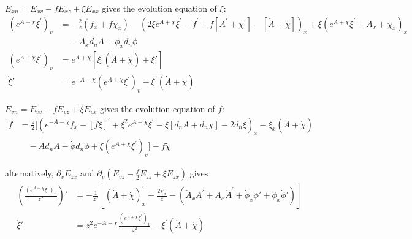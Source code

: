 \documentclass[12pt,a4paper]{ctexart}
\numberwithin{equation}{section}
\begin{document}
$E_{xn}=E_{xv}-fE_{xz}+\xi E_{xx}$ gives the evolution equation of $\xi$:
\begin{equation}
    \begin{aligned} 
        (e^{A+\chi}\xi^{\prime})_{v}&=-\frac{2}{z}(f_{x}+f\chi_{x})-(2\xi e^{A+\chi}\xi^{\prime}-f^{\prime}+f[A^{\prime}+\chi^{\prime}]-[\dot{A}+\dot{\chi}])_{x}+\xi(e^{A+\chi}\xi^{\prime}+A_{x}+\chi_{x})_{x}\\
        &\quad-A_{x}d_{n}A-\phi_{x}d_n\phi\\
        (e^{A+\chi}\xi^{\prime})_{v}&=e^{A+\chi}[\xi^{\prime}(\dot{A}+\dot{\chi})+\dot{\xi}']\\
        \dot{\xi}'&=e^{-A-\chi}(e^{A+\chi}\xi^{\prime})_{v}-\xi^{\prime}(\dot{A}+\dot{\chi})
    \end{aligned}
\end{equation}

$E_{vn}=E_{vv}-fE_{vz}+\xi E_{vx}$ gives the evolution equation of $f$:
\begin{equation}
    \begin{aligned}
        \dot{f}&=\frac{z}{2}[(e^{-A-\chi}f_{x}-[f\xi]^{\prime}+\xi^{2}e^{A+\chi}\xi^{\prime}-\xi[d_{n}A+d_{n}\chi]-2d_{n}\xi)_{x}-\xi_x(\dot{A}+\dot{\chi})\\
        &\quad-\dot{A}d_{n}A-\dot{\phi}d_n\phi+\xi(e^{A+\chi}\xi^{\prime})_{v}]-f\dot{\chi}
    \end{aligned}
\end{equation}

alternatively, $\partial_v E_{zx}$ and $\partial_v (E_{vz}-\frac{f}{2}E_{zz}+\xi E_{zx})$ gives
\begin{equation}
    \begin{aligned}
        \left(\frac{(e^{A+\chi}\xi')_v}{z^2}\right)'&=-\frac{1}{z^{2}}[(\dot{A}+\dot{\chi})^{\prime}_{x}+\frac{2\dot{\chi}_{x}}{z}
        -(\dot{A}_{x}A^{\prime}+A_{x}\dot{A}^{\prime}+\dot{\phi}_{x}\phi'+\phi_{x}\dot{\phi}')]\\
        \dot{\xi}'&=z^2e^{-A-\chi}\frac{(e^{A+\chi}\xi^{\prime})_{v}}{z^2}-\xi^{\prime}(\dot{A}+\dot{\chi})
    \end{aligned}
\end{equation}
\end{document}
